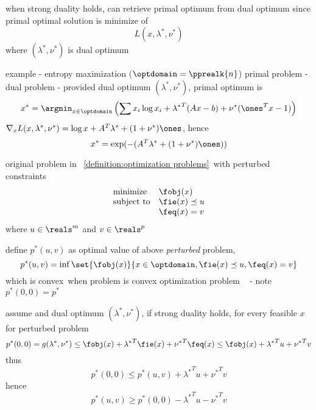 \documentclass[17pt,landscape]{foils}
\begin{document}
{

\bit
\item
	when strong duality holds,
	can retrieve primal optimum from dual optimum
	since
	primal optimal solution is minimize of
	$$
		L(x,\lambda^\ast,\nu^\ast)
	$$
	where $(\lambda^\ast, \nu^\ast)$ is dual optimum

\vitem
	example - entropy maximization
		($\optdomain = \pprealk{n}$)
	\bit
	\vitem
		primal problem - 
	\vitem
		dual problem - 
	\vitem provided dual optimum $(\lambda^\ast,\nu^\ast)$,
		primal optimum is
		$$
			x^\ast
			= \argmin_{x\in\optdomain}
			\left(
				\sum x_i \log x_i + {\lambda^\ast}^T (Ax-b) + \nu^\ast(\ones^Tx -1)
			\right)
		$$
	\vitem
		$\nabla_x L(x,\lambda^\ast,\nu^\ast) = \log x + A^T \lambda^\ast + (1+\nu^\ast)\ones$,
		hence
		$$
			x^\ast = \exp(-(A^T \lambda^\ast + (1+\nu^\ast)\ones))
		$$
	\eit
\eit
\vfill



\bit
\item
	original problem in ~\ref{definition:optimization problems}\
	with perturbed constraints
	$$
		\begin{array}{ll}
			\mbox{minimize} &
				\fobj(x)
			\\
			\mbox{subject to} &
				\fie(x) \preceq u
			\\ &
				\feq(x) =v
		\end{array}
	$$
	where $u\in\reals^m$ and $v\in\reals^p$

\item
	define $p^\ast(u,v)$ as optimal value of above \emph{perturbed} problem,
	\ie\
	$$
		p^\ast(u,v) = \inf\set{\fobj(x)}{x\in\optdomain, \fie(x) \preceq u, \feq(x) = v}
	$$
	which is convex\
	when problem is convex optimization problem
	\
	- note
		$p^\ast(0,0)=p^\ast$

\item
	assume and dual optimum $(\lambda^\ast,\nu^\ast)$,
	if strong duality holds,
	for every feasible $x$ for perturbed problem
	$$
		p^\ast(0,0)=g(\lambda^\ast,\nu^\ast)
		\leq \fobj(x) + {\lambda^\ast}^T \fie(x) + {\nu^\ast}^T \feq(x)
		\leq \fobj(x) + {\lambda^\ast}^T u + {\nu^\ast}^T v
	$$
	thus
	$$
		p^\ast(0,0)\leq p^\ast(u,v) + {\lambda^\ast}^T u + {\nu^\ast}^T v
	$$
	hence
	$$
		p^\ast(u,v)\geq p^\ast(0,0) - {\lambda^\ast}^T u - {\nu^\ast}^T v
	$$

}
\end{document}
